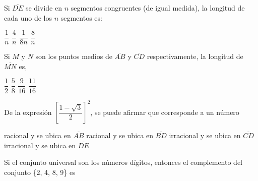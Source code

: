 \documentclass[10pt,letterpaper,addpoints]{exam}
\begin{document}
\begin{multicols}{2}
\begin{questions}
 \begin{center}
\end{center}
\question \label{firstq}Si $\overline{DE}$ se divide en $n$ segmentos congruentes (de igual medida), la longitud de cada uno de los $n$ segmentos es:
\begin{choices}
\begin{multicols}{2}
\choice $\dfrac{1}{n}$
\choice $\dfrac{4}{n}$
\CorrectChoice $\dfrac{1}{8n}$
\choice $\dfrac{8}{n}$
\end{multicols}
\end{choices}
\question Si $M$ y $N$ son los puntos medios de $\overline{AB}$ y $\overline{CD}$ respectivamente, la longitud de $\overline{MN}$ es,
\begin{choices}
\begin{multicols}{2}
 \choice $\dfrac{1}{2}$
 \choice $\dfrac{5}{8}$
 \choice $\dfrac{9}{16}$
 \CorrectChoice $\dfrac{11}{16}$
\end{multicols}
\end{choices}
\question \label{lastq} De la expresión $\left[\dfrac{1-\sqrt{3}}{2}\right]^{2}$, se puede afirmar que corresponde a un número
\begin{choices}
 \choice racional y se ubica en $\overline{AB}$
 \choice racional y se ubica en $\overline{BD}$
 \choice irracional y se ubica en $\overline{CD}$
 \CorrectChoice irracional y se ubica en $\overline{DE}$
\end{choices}
\question Si el conjunto universal son los números dígitos, entonces el complemento del conjunto \{2, 4, 8, 9\} es
\begin{choices}
\begin{multicols}{2}

\end{multicols}
\end{choices}
\end{questions}
\end{multicols}
\end{document}
